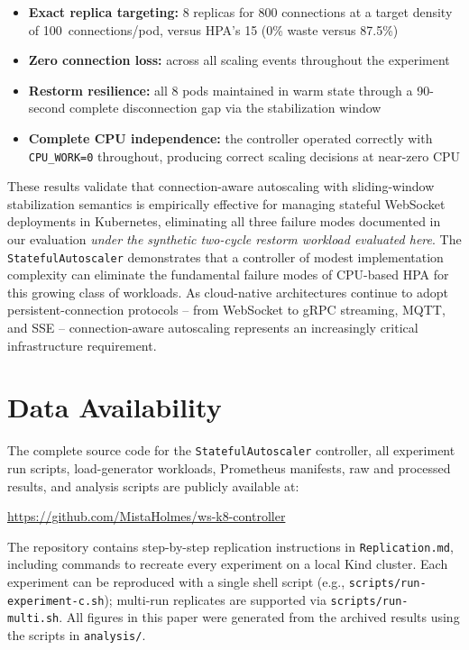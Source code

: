 \documentclass[twocolumn]{svjour3}
\begin{document}
\begin{itemize}[leftmargin=*]
\item \textbf{Exact replica targeting:} 8 replicas for 800 connections at a target density of 100~connections/pod, versus HPA's 15 (0\% waste versus 87.5\%)
\item \textbf{Zero connection loss:} across all scaling events throughout the experiment
\item \textbf{Restorm resilience:} all 8 pods maintained in warm state through a 90-second complete disconnection gap via the stabilization window
\item \textbf{Complete CPU independence:} the controller operated correctly with \texttt{CPU\_WORK=0} throughout, producing correct scaling decisions at near-zero CPU
\end{itemize}

These results validate that connection-aware autoscaling with sliding-window stabilization semantics is empirically effective for managing stateful WebSocket deployments in Kubernetes, eliminating all three failure modes documented in our evaluation \textit{under the synthetic two-cycle restorm workload evaluated here}. The \texttt{StatefulAutoscaler} demonstrates that a controller of modest implementation complexity can eliminate the fundamental failure modes of CPU-based HPA for this growing class of workloads. As cloud-native architectures continue to adopt persistent-connection protocols -- from WebSocket to gRPC streaming, MQTT, and SSE -- connection-aware autoscaling represents an increasingly critical infrastructure requirement.


\section*{Data Availability}

The complete source code for the \texttt{StatefulAutoscaler} controller, all experiment run scripts, load-generator workloads, Prometheus manifests, raw and processed results, and analysis scripts are publicly available at:

\begin{center}
\url{https://github.com/MistaHolmes/ws-k8-controller}
\end{center}

The repository contains step-by-step replication instructions in \texttt{Replication.md}, including commands to recreate every experiment on a local Kind cluster.  Each experiment can be reproduced with a single shell script (e.g., \texttt{scripts/run-experiment-c.sh}); multi-run replicates are supported via \texttt{scripts/run-multi.sh}.  All figures in this paper were generated from the archived results using the scripts in \texttt{analysis/}.
\end{document}
